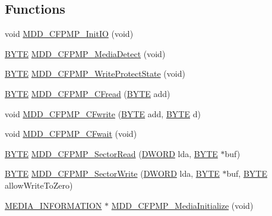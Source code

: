 \subsection*{Functions}
\begin{DoxyCompactItemize}
\item 
void \hyperlink{_c_f-_p_m_p_8h_a408b56945a369c5bdde02a058679fce9}{M\+D\+D\+\_\+\+C\+F\+P\+M\+P\+\_\+\+Init\+I\+O} (void)
\item 
\hyperlink{_generic_type_defs_8h_a4ae1dab0fb4b072a66584546209e7d58}{B\+Y\+T\+E} \hyperlink{_c_f-_p_m_p_8h_afe0db232f6fa067f467828dabd985ccd}{M\+D\+D\+\_\+\+C\+F\+P\+M\+P\+\_\+\+Media\+Detect} (void)
\item 
\hyperlink{_generic_type_defs_8h_a4ae1dab0fb4b072a66584546209e7d58}{B\+Y\+T\+E} \hyperlink{_c_f-_p_m_p_8h_ad245068649eadb67a89f6a589f4bf2c0}{M\+D\+D\+\_\+\+C\+F\+P\+M\+P\+\_\+\+Write\+Protect\+State} (void)
\item 
\hyperlink{_generic_type_defs_8h_a4ae1dab0fb4b072a66584546209e7d58}{B\+Y\+T\+E} \hyperlink{_c_f-_p_m_p_8h_a4027bb98ca68baf83d47a23636046ee5}{M\+D\+D\+\_\+\+C\+F\+P\+M\+P\+\_\+\+C\+Fread} (\hyperlink{_generic_type_defs_8h_a4ae1dab0fb4b072a66584546209e7d58}{B\+Y\+T\+E} add)
\item 
void \hyperlink{_c_f-_p_m_p_8h_a767298e05fe030bd0caac51b1718c1d7}{M\+D\+D\+\_\+\+C\+F\+P\+M\+P\+\_\+\+C\+Fwrite} (\hyperlink{_generic_type_defs_8h_a4ae1dab0fb4b072a66584546209e7d58}{B\+Y\+T\+E} add, \hyperlink{_generic_type_defs_8h_a4ae1dab0fb4b072a66584546209e7d58}{B\+Y\+T\+E} d)
\item 
void \hyperlink{_c_f-_p_m_p_8h_a4c29530f84e422bdd8da8e67bc7bb743}{M\+D\+D\+\_\+\+C\+F\+P\+M\+P\+\_\+\+C\+Fwait} (void)
\item 
\hyperlink{_generic_type_defs_8h_a4ae1dab0fb4b072a66584546209e7d58}{B\+Y\+T\+E} \hyperlink{_c_f-_p_m_p_8h_ae328d0ffa3df0e91b8ee5098959eb454}{M\+D\+D\+\_\+\+C\+F\+P\+M\+P\+\_\+\+Sector\+Read} (\hyperlink{_generic_type_defs_8h_ad342ac907eb044443153a22f964bf0af}{D\+W\+O\+R\+D} lda, \hyperlink{_generic_type_defs_8h_a4ae1dab0fb4b072a66584546209e7d58}{B\+Y\+T\+E} $\ast$buf)
\item 
\hyperlink{_generic_type_defs_8h_a4ae1dab0fb4b072a66584546209e7d58}{B\+Y\+T\+E} \hyperlink{_c_f-_p_m_p_8h_a20fde13fe36573ef9084795e890882e5}{M\+D\+D\+\_\+\+C\+F\+P\+M\+P\+\_\+\+Sector\+Write} (\hyperlink{_generic_type_defs_8h_ad342ac907eb044443153a22f964bf0af}{D\+W\+O\+R\+D} lda, \hyperlink{_generic_type_defs_8h_a4ae1dab0fb4b072a66584546209e7d58}{B\+Y\+T\+E} $\ast$buf, \hyperlink{_generic_type_defs_8h_a4ae1dab0fb4b072a66584546209e7d58}{B\+Y\+T\+E} allow\+Write\+To\+Zero)
\item 
\hyperlink{struct_m_e_d_i_a___i_n_f_o_r_m_a_t_i_o_n}{M\+E\+D\+I\+A\+\_\+\+I\+N\+F\+O\+R\+M\+A\+T\+I\+O\+N} $\ast$ \hyperlink{_c_f-_p_m_p_8h_aaffe0c76d2b2fc65560eaeef68881293}{M\+D\+D\+\_\+\+C\+F\+P\+M\+P\+\_\+\+Media\+Initialize} (void)
\end{DoxyCompactItemize}


